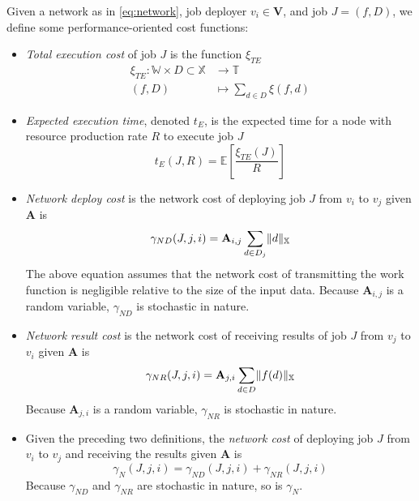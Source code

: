 \documentclass[../mthe-493-project-proposal.tex]{subfiles}
\begin{document}
    Given a network as in \eqref{eq:network}, job deployer $v_i \in \mathbf{V}$, and job $J = (f, D)$, we define some performance-oriented cost functions:
    \begin{itemize}
        \item \textit{Total execution cost} of job $J$ is the function $\xi_{TE}$
              \begin{align}
                  \xi_{TE} \colon \mathbb{W} \times D \subset \mathbb{X} &\to \mathbb{T} \label{eq:total-execution-cost}    \\
                  (f, D)                                                 &\mapsto \sum\limits_{d \in D} \xi(f, d) \nonumber
              \end{align}

        \item \textit{Expected execution time}, denoted $t_E$, is the expected time for a node with resource production rate $R$ to execute job $J$
              \begin{equation}
                  \label{eq:expected-execution-time}
                  t_E(J, R) = \mathbb{E}\left[ \frac{\xi_{TE}(J)}{R} \right]
              \end{equation}

        \item \textit{Network deploy cost} is the network cost of deploying job $J$ from $v_i$ to $v_j$ given $\mathbf{A}$ is
              \begin{equation}
                  \label{eq:network-deploy-cost}
                  \gamma_{ND}(J, j, i) = \mathbf{A}_{i,j} \sum\limits_{d \in D_j} \lVert d\rVert_{\mathbb{X}}
              \end{equation}
              The above equation assumes that the network cost of transmitting the work function is negligible relative to the size of the input data. Because $\mathbf{A}_{i,j}$ is a random variable, $\gamma_{ND}$ is stochastic in nature.

        \item \textit{Network result cost} is the network cost of receiving results of job $J$ from $v_j$ to $v_i$ given $\mathbf{A}$ is
              \begin{equation}
                  \label{eq:network-result-cost}
                  \gamma_{NR}(J, j, i) = \mathbf{A}_{j, i} \sum\limits_{d \in D} \lVert f(d)\rVert_{\mathbb{X}}
              \end{equation}
              Because $\mathbf{A}_{j,i}$ is a random variable, $\gamma_{NR}$ is stochastic in nature.

        \item Given the preceding two definitions, the \textit{network cost} of deploying job $J$ from $v_i$ to $v_j$ and receiving the results  given $\mathbf{A}$ is
              \begin{equation}
                  \label{eq:network-cost}
                  \gamma_N(J, j, i) = \gamma_{ND}(J, j, i) + \gamma_{NR}(J, j, i)
              \end{equation}
              Because $\gamma_{ND}$ and $\gamma_{NR}$ are stochastic in nature, so is $\gamma_N$.
    \end{itemize}
\end{document}
